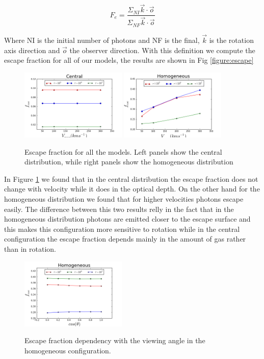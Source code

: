 \documentclass[usenatbib]{mn2e}
\begin{document}
\begin{equation}
F_{e}=\dfrac{\Sigma_{NI} \vec{k}\cdot \vec{o}}{\Sigma_{NF}\vec{k}\cdot \vec{o}}
\end{equation}

Where NI is the initial number of photons and NF is the final,
$\vec{k}$ is the rotation axis direction and $\vec{o}$ the observer
direction. With this definition we compute the escape fraction for all
of our models, the results are shown in Fig \ref{figure:escape}\\  
 
\begin{figure}
  \includegraphics[width=0.45\textwidth]{FECENTRAL.png}
  \includegraphics[width=0.45\textwidth]{FEHOMOGENEOUS.png}
   \label{figure:efvsv}\caption{Escape fraction for all the models. Left
    panels show the central distribution, while right panels show the
    homogeneous distribution} 
\end{figure}

In Figure \ref{figure:efvsv} we found that in the central distribution the escape fraction does not change with velocity while it
does in the optical depth. On the other hand for the homogeneous distribution
we found that for higher velocities photons escape easily. The
difference between this two results relly in the fact that in the
homogeneous distribution photons are emitted closer to the escape
surface and this makes this configuration more sensitive to
rotation while in the central configuration the escape fraction depends mainly in the amount of gas rather than in rotation.    

\begin{figure}
  \includegraphics[width=0.45\textwidth]{FEHomogeneousvsThetaL.png}
 \label{figure:efvstheta}\caption{Escape fraction dependency with the viewing angle in the homogeneous configuration.} 
\end{figure}
\end{document}
